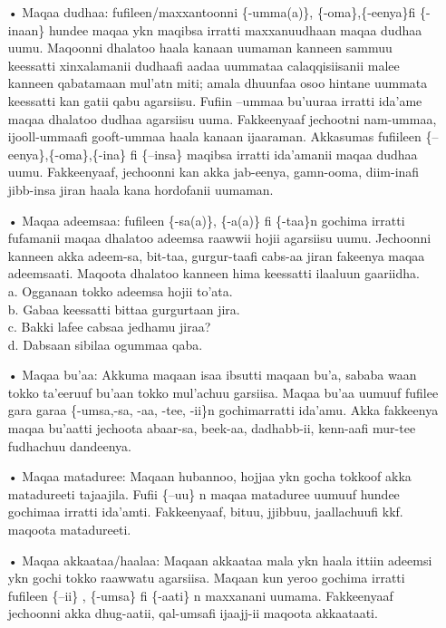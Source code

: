 \documentclass[11pt,b5paper]{book}
\begin{document}
\begin{itemize}

\item[•] Maqaa dudhaa: fufileen/maxxantoonni \{-umma(a)\}, \{-oma\},\{-eenya\}fi \{-inaan\} hundee maqaa ykn maqibsa irratti maxxanuudhaan maqaa dudhaa uumu. Maqoonni dhalatoo haala kanaan uumaman kanneen sammuu keessatti xinxalamanii dudhaafi aadaa uummataa calaqqisiisanii malee kanneen qabatamaan mul'atn miti; amala dhuunfaa osoo hintane uummata keessatti kan gatii qabu agarsiisu. Fufiin {–ummaa} bu'uuraa irratti ida’ame maqaa dhalatoo dudhaa agarsiisu uuma. Fakkeenyaaf jechootni nam-ummaa, ijooll-ummaafi gooft-ummaa haala kanaan ijaaraman. Akkasumas fufiileen \{–eenya\},\{-oma\},\{-ina\} fi \{–insa\} maqibsa irratti ida’amanii maqaa dudhaa uumu. Fakkeenyaaf, jechoonni kan akka jab-eenya, gamn-ooma, diim-inafi jibb-insa jiran haala kana hordofanii uumaman. 

\item[•] Maqaa adeemsaa: fufileen \{-sa(a)\}, \{-a(a)\} fi \{-taa\}n gochima irratti fufamanii maqaa dhalatoo adeemsa raawwii hojii agarsiisu uumu. Jechoonni kanneen akka adeem-sa, bit-taa, gurgur-taafi cabs-aa jiran fakeenya maqaa adeemsaati. Maqoota dhalatoo kanneen hima keessatti ilaaluun gaariidha.\\
a. Ogganaan tokko adeemsa hojii to’ata.\\
b. Gabaa keessatti bittaa gurgurtaan jira.\\
c. Bakki lafee cabsaa jedhamu jiraa?\\
d. Dabsaan sibilaa ogummaa qaba.

\item[•] Maqaa bu’aa: Akkuma maqaan isaa ibsutti maqaan bu'a, sababa waan tokko ta’eeruuf bu’aan tokko mul’achuu garsiisa. Maqaa bu’aa uumuuf fufilee gara garaa \{-umsa,-sa, -aa, -tee, -ii\}n gochimarratti ida’amu. Akka fakkeenya maqaa bu'aatti jechoota abaar-sa, beek-aa, dadhabb-ii, kenn-aafi mur-tee fudhachuu dandeenya.

\item[•] Maqaa mataduree: Maqaan hubannoo, hojjaa ykn gocha tokkoof akka matadureeti tajaajila. Fufii \{–uu\} n maqaa mataduree uumuuf hundee gochimaa irratti ida'amti. Fakkeenyaaf, bituu, jjibbuu, jaallachuufi kkf. maqoota matadureeti. 

\item[•] Maqaa akkaataa/haalaa: Maqaan akkaataa mala ykn haala ittiin adeemsi ykn gochi tokko raawwatu agarsiisa. Maqaan kun yeroo gochima irratti fufileen \{–ii\} , \{-umsa\} fi \{-aati\} n maxxanani uumama. Fakkeenyaaf jechoonni akka dhug-aatii, qal-umsafi ijaajj-ii maqoota akkaataati.


\end{itemize}
\end{document}
